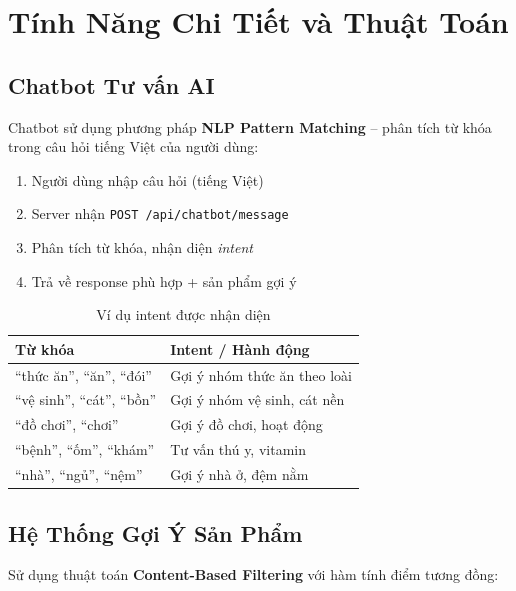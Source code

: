 \documentclass[12pt, a4paper]{report}
\begin{document}
\chapter{Tính Năng Chi Tiết và Thuật Toán}

\section{Chatbot Tư vấn AI}

Chatbot sử dụng phương pháp \textbf{NLP Pattern Matching} – phân tích từ khóa trong câu hỏi tiếng Việt của người dùng:

\begin{enumerate}[leftmargin=*, label=\textbf{Bước \arabic*.}]
    \item Người dùng nhập câu hỏi (tiếng Việt)
    \item Server nhận \texttt{POST /api/chatbot/message}
    \item Phân tích từ khóa, nhận diện \textit{intent}
    \item Trả về response phù hợp + sản phẩm gợi ý
\end{enumerate}

\begin{table}[H]
    \centering
    \caption{Ví dụ intent được nhận diện}
    \begin{tabular}{p{5cm}p{8cm}}
        \toprule
        \textbf{Từ khóa} & \textbf{Intent / Hành động} \\
        \midrule
        ``thức ăn'', ``ăn'', ``đói'' & Gợi ý nhóm thức ăn theo loài \\
        ``vệ sinh'', ``cát'', ``bồn'' & Gợi ý nhóm vệ sinh, cát nền \\
        ``đồ chơi'', ``chơi''          & Gợi ý đồ chơi, hoạt động \\
        ``bệnh'', ``ốm'', ``khám''     & Tư vấn thú y, vitamin \\
        ``nhà'', ``ngủ'', ``nệm''      & Gợi ý nhà ở, đệm nằm \\
        \bottomrule
    \end{tabular}
\end{table}

\section{Hệ Thống Gợi Ý Sản Phẩm}

Sử dụng thuật toán \textbf{Content-Based Filtering} với hàm tính điểm tương đồng:
\end{document}
